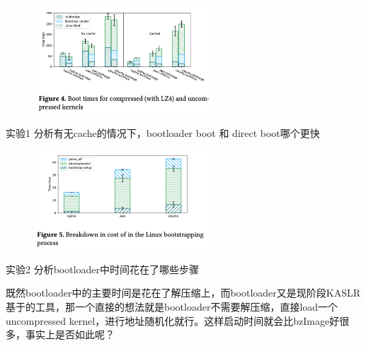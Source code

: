 \documentclass[
    aspectratio=169,  %
]{ctexbeamer}
\begin{document}
\begin{frame}
  
  \begin{figure}
  	\centering
  	\includegraphics[width=0.6\textwidth]{img/boot_time_compare.png}
  \end{figure}

\begin{block}{实验1}
  分析有无cache的情况下，bootloader boot 和 direct boot哪个更快
\end{block}


\end{frame}

\begin{frame}
  \begin{figure}
  	\centering
  	\includegraphics[width=0.6\textwidth]{img/boot_breakdown.png}
  \end{figure}

\begin{block}{实验2}
  分析bootloader中时间花在了哪些步骤
\end{block}

\end{frame}

\begin{frame}

既然bootloader中的主要时间是花在了解压缩上，而bootloader又是现阶段KASLR基于的工具，那一个直接的想法就是bootloader不需要解压缩，直接load一个uncompressed kernel，进行地址随机化就行。这样启动时间就会比bzImage好很多，事实上是否如此呢？

\end{frame}
\end{document}
